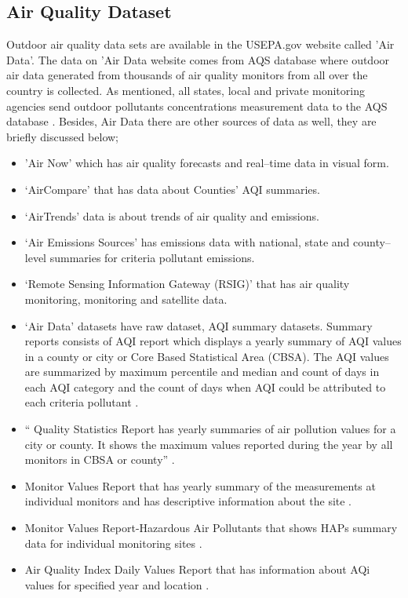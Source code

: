 \documentclass[sigconf]{acmart}
\begin{document}
\subsection{Air Quality Dataset}
   Outdoor air quality data sets are available in the USEPA.gov website called 'Air Data'. The data on 'Air Data website comes from AQS database where outdoor air data generated from thousands of air quality monitors from all over the country is collected. As mentioned, all states, local and private monitoring agencies send outdoor pollutants concentrations measurement data to the AQS database \cite{epa-gov}. Besides, Air Data there are other sources of data as well, they are briefly discussed below; 
\begin{itemize}
   \item 'Air Now' which
          has air quality forecasts and real--time data in visual form.

   \item `AirCompare' that has data about Counties' AQI summaries.
   \item `AirTrends' data is about trends of air quality and emissions.
   \item `Air Emissions Sources' has emissions data with national, state and county--level  summaries for criteria pollutant emissions.
   \item `Remote Sensing Information Gateway (RSIG)' that has air quality monitoring, monitoring and satellite data.
  \item `Air Data' datasets  have raw dataset,  AQI summary datasets. Summary reports consists of        AQI report which displays a yearly summary of AQI values in a county or city or Core     Based Statistical Area (CBSA). The AQI values are summarized by maximum percentile and median and count of days in each AQI category and the count of days when AQI could be attributed to each criteria pollutant \cite{epa-gov}.

  \item `` Quality Statistics Report has yearly summaries of air pollution values for a city or county. It shows the maximum values reported during the year by all monitors in CBSA or county'' \cite{epa-gov}.

  \item Monitor Values Report that has yearly summary of the measurements at individual monitors and has descriptive information about the site \cite{epa-gov}.

  \item Monitor Values Report-Hazardous Air Pollutants that shows HAPs summary data for individual monitoring sites \cite{epa-gov}.

  \item Air Quality Index Daily Values Report that has information about AQi values for specified year and location \cite{epa-gov}.
\end{itemize}
\end{document}
